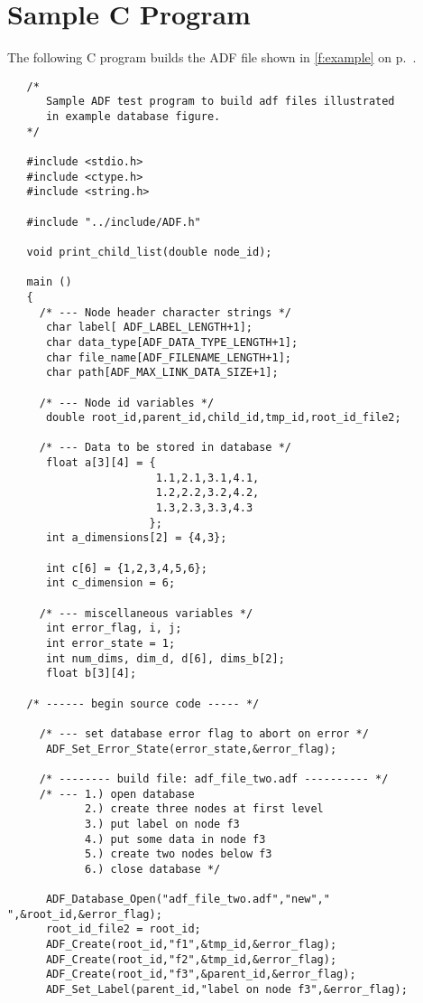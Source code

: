\section{Sample C Program}
\label{s:sampleC}
\thispagestyle{plain}

The following C program builds the ADF file shown in
\autoref{f:example} on p.~\pageref*{f:example}.

\begin{verbatim}
   /*
      Sample ADF test program to build adf files illustrated
      in example database figure.
   */

   #include <stdio.h>
   #include <ctype.h>
   #include <string.h>

   #include "../include/ADF.h"

   void print_child_list(double node_id);

   main ()
   {
     /* --- Node header character strings */
      char label[ ADF_LABEL_LENGTH+1];
      char data_type[ADF_DATA_TYPE_LENGTH+1];
      char file_name[ADF_FILENAME_LENGTH+1];
      char path[ADF_MAX_LINK_DATA_SIZE+1];

     /* --- Node id variables */
      double root_id,parent_id,child_id,tmp_id,root_id_file2;

     /* --- Data to be stored in database */
      float a[3][4] = {
                       1.1,2.1,3.1,4.1,
                       1.2,2.2,3.2,4.2,
                       1.3,2.3,3.3,4.3
                      };
      int a_dimensions[2] = {4,3};

      int c[6] = {1,2,3,4,5,6};
      int c_dimension = 6;

     /* --- miscellaneous variables */
      int error_flag, i, j;
      int error_state = 1;
      int num_dims, dim_d, d[6], dims_b[2];
      float b[3][4];

   /* ------ begin source code ----- */

     /* --- set database error flag to abort on error */
      ADF_Set_Error_State(error_state,&error_flag);

     /* -------- build file: adf_file_two.adf ---------- */
     /* --- 1.) open database
            2.) create three nodes at first level
            3.) put label on node f3
            4.) put some data in node f3
            5.) create two nodes below f3
            6.) close database */

      ADF_Database_Open("adf_file_two.adf","new"," ",&root_id,&error_flag);
      root_id_file2 = root_id;
      ADF_Create(root_id,"f1",&tmp_id,&error_flag);
      ADF_Create(root_id,"f2",&tmp_id,&error_flag);
      ADF_Create(root_id,"f3",&parent_id,&error_flag);
      ADF_Set_Label(parent_id,"label on node f3",&error_flag);


\end{verbatim}
